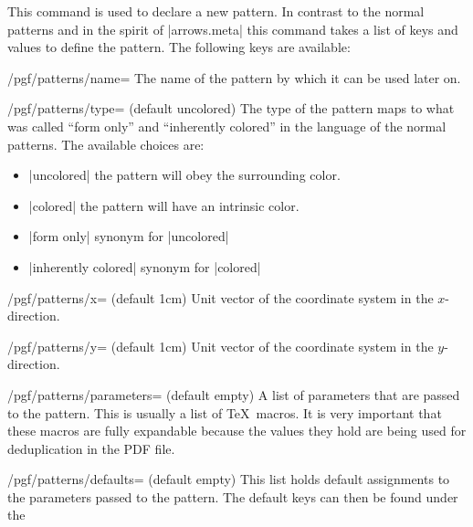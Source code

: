 \begin{command}{\pgfdeclarepattern{}}
    This command is used to declare a new pattern. In contrast to the normal
    patterns and in the spirit of |arrows.meta| this command takes a list of
    keys and values to define the pattern. The following keys are available:
    \begin{key}{/pgf/patterns/name=}
        The name of the pattern by which it can be used later on.
    \end{key}
    \begin{key}{/pgf/patterns/type= (default uncolored)}
        The type of the pattern maps to what was called ``form only'' and
        ``inherently colored'' in the language of the normal patterns. The
        available choices are:
        \begin{itemize}
            \item |uncolored| the pattern will obey the surrounding color.
            \item |colored| the pattern will have an intrinsic color.
            \item |form only| synonym for |uncolored|
            \item |inherently colored| synonym for |colored|
        \end{itemize}
    \end{key}
    \begin{key}{/pgf/patterns/x= (default 1cm)}
        Unit vector of the coordinate system in the $x$-direction.
    \end{key}
    \begin{key}{/pgf/patterns/y= (default 1cm)}
        Unit vector of the coordinate system in the $y$-direction.
    \end{key}
    \begin{key}{/pgf/patterns/parameters= (default \normalfont empty)}
        A list of parameters that are passed to the pattern. This is usually a
        list of \TeX\ macros. It is very important that these macros are fully
        expandable because the values they hold are being used for
        deduplication in the PDF file.
    \end{key}
    \begin{key}{/pgf/patterns/defaults= (default \normalfont empty)}
        This list holds default assignments to the parameters passed to the
        pattern. The default keys can then be found under the

\end{key}
\end{command}
